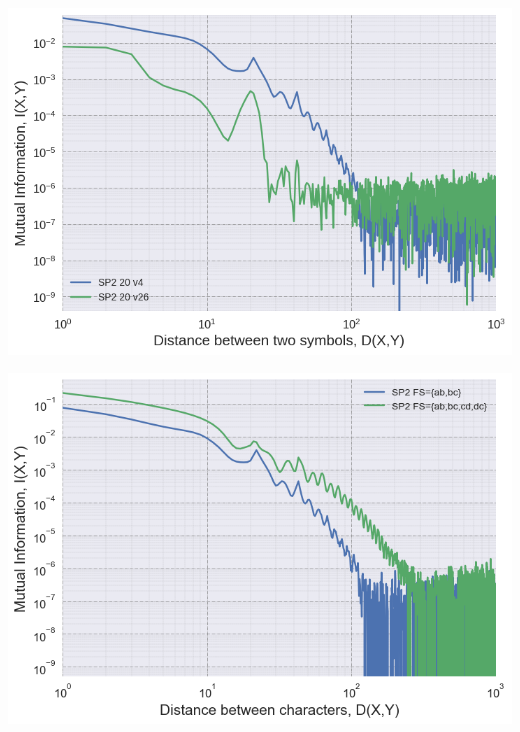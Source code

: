 \documentclass[a0,portrait]{a0poster}
\begin{document}
\begin{multicols}{2}
\begin{center}
\begin{minipage}[b]{0.45\linewidth}
\centering
\includegraphics[width=\textwidth]{spk_v.png}
\label{fig:spk_v}
\end{minipage}
\hspace{0.5cm}
\begin{minipage}[b]{0.45\linewidth}
\centering
\includegraphics[width=\textwidth]{spk_f.png}
\label{fig:spk_f}
\end{minipage}
\end{center}


\end{multicols}
\end{document}
